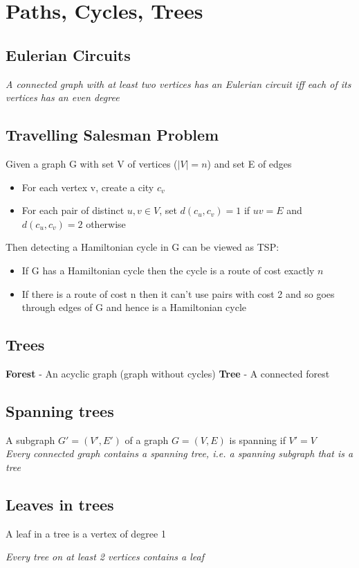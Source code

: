 \documentclass{article}[18pt]
\begin{document}
\section{Paths, Cycles, Trees}
\subsection{Eulerian Circuits}
\textit{A connected graph with at least two vertices has an Eulerian circuit iff each of its vertices has an even degree}
\subsection{Travelling Salesman Problem}
Given a graph G with set V of vertices ($|V|=n$) and set E of edges
\begin{itemize}
	\item For each vertex v, create a city $c_v$
	\item For each pair of distinct $u,v\in V$, set $d(c_u,c_v)=1$ if $uv=E$ and $d(c_u,c_v)=2$ otherwise  
\end{itemize}
Then detecting a Hamiltonian cycle in G can be viewed as TSP:
\begin{itemize}
	\item If G has a Hamiltonian cycle then the cycle is a route of cost exactly $n$
	\item If there is a route of cost n then it can't use pairs with cost 2 and so goes through edges of G and hence is a Hamiltonian cycle
\end{itemize}
\subsection{Trees}
\textbf{Forest} - An acyclic graph (graph without cycles)
\textbf{Tree} - A connected forest
\subsection{Spanning trees}
A subgraph $G'=(V',E')$ of a graph $G=(V,E)$ is spanning if $V'=V$\\
\textit{Every connected graph contains a spanning tree, i.e. a spanning subgraph that is a tree}
\subsection{Leaves in trees}
A leaf in a tree is a vertex of degree 1
\begin{center}
	\textit{Every tree on at least 2 vertices contains a leaf}
\end{center}
\end{document}
